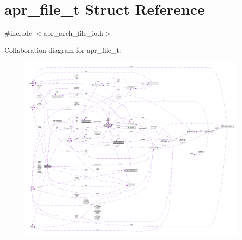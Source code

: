 \hypertarget{structapr__file__t}{}\section{apr\+\_\+file\+\_\+t Struct Reference}
\label{structapr__file__t}


{\ttfamily \#include $<$apr\+\_\+arch\+\_\+file\+\_\+io.\+h$>$}



Collaboration diagram for apr\+\_\+file\+\_\+t\+:
\nopagebreak
\begin{figure}[H]
\begin{center}
\leavevmode
\includegraphics[width=350pt]{structapr__file__t__coll__graph}
\end{center}
\end{figure}
